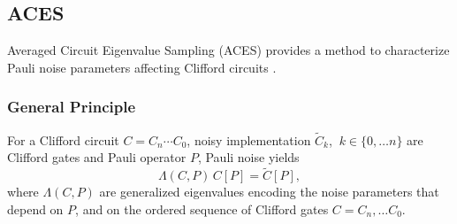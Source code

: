 


\subsection{ACES}
Averaged Circuit Eigenvalue Sampling (ACES) provides a method to characterize
Pauli noise parameters affecting Clifford circuits \cite{}.

\subsubsection{General Principle}
For a Clifford circuit $C = C_n \cdots C_0$, noisy implementation
$\tilde{C}_k$, \(\ k \in \{0,\ldots n\}\) are Clifford gates and Pauli operator $P$, Pauli noise yields
\[
\Lambda(C,P) \, C[P] = \tilde{C}[P],
\]
where $\Lambda(C,P)$ are generalized eigenvalues encoding the noise parameters that depend on \(P\), and on the ordered sequence of Clifford gates \(C = C_n, \ldots C_0\).





